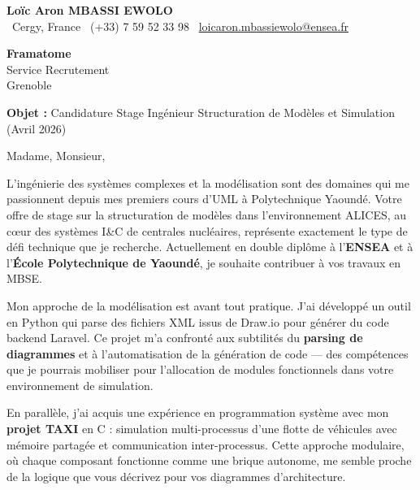 \documentclass[a4paper,11pt]{article}
\begin{document}
\begin{center}
    {\Large \textbf{Loïc Aron MBASSI EWOLO}}\\[4pt]
    \small
    \faMapMarker\ Cergy, France \quad
    \faPhone\ (+33) 7 59 52 33 98 \quad
    \faEnvelope\ \href{mailto:loicaron.mbassiewolo@ensea.fr}{loicaron.mbassiewolo@ensea.fr}
\end{center}
\vspace{0.5cm}

\hfill
\begin{minipage}[t]{0.45\textwidth}
    \textbf{Framatome}\\
    Service Recrutement\\
    Grenoble
\end{minipage}

\vspace{1cm}

\textbf{Objet :} Candidature Stage Ingénieur Structuration de Modèles et Simulation (Avril 2026)

\vspace{0.5cm}

Madame, Monsieur,

L'ingénierie des systèmes complexes et la modélisation sont des domaines qui me passionnent depuis mes premiers cours d'UML à Polytechnique Yaoundé. Votre offre de stage sur la structuration de modèles dans l'environnement ALICES, au cœur des systèmes I\&C de centrales nucléaires, représente exactement le type de défi technique que je recherche. Actuellement en double diplôme à l'\textbf{ENSEA} et à l'\textbf{École Polytechnique de Yaoundé}, je souhaite contribuer à vos travaux en MBSE.

Mon approche de la modélisation est avant tout pratique. J'ai développé un outil en Python qui parse des fichiers XML issus de Draw.io pour générer du code backend Laravel. Ce projet m'a confronté aux subtilités du \textbf{parsing de diagrammes} et à l'automatisation de la génération de code — des compétences que je pourrais mobiliser pour l'allocation de modules fonctionnels dans votre environnement de simulation.

En parallèle, j'ai acquis une expérience en programmation système avec mon \textbf{projet TAXI} en C : simulation multi-processus d'une flotte de véhicules avec mémoire partagée et communication inter-processus. Cette approche modulaire, où chaque composant fonctionne comme une brique autonome, me semble proche de la logique que vous décrivez pour vos diagrammes d'architecture.
\end{document}
